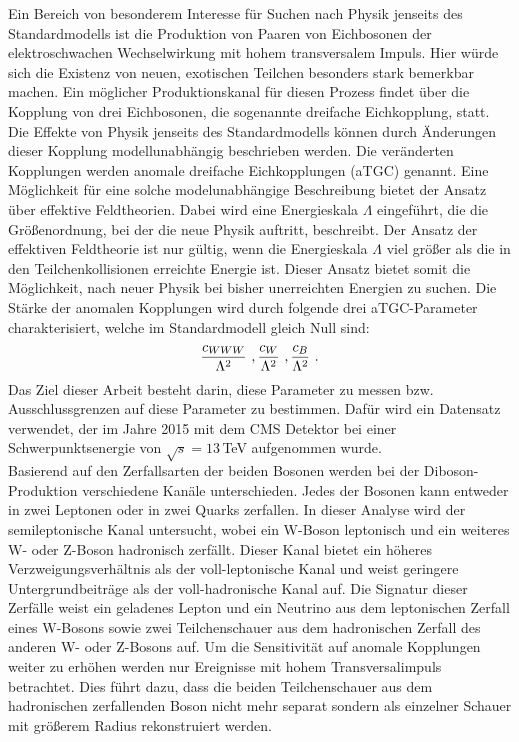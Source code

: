 Ein Bereich von besonderem Interesse für Suchen nach Physik jenseits des Standardmodells ist die Produktion von Paaren von Eichbosonen der elektroschwachen Wechselwirkung mit hohem transversalem Impuls. Hier würde sich die Existenz von neuen, exotischen Teilchen besonders stark bemerkbar machen. Ein möglicher Produktionskanal für diesen Prozess findet über die Kopplung von drei Eichbosonen, die sogenannte dreifache Eichkopplung, statt. Die Effekte von Physik jenseits des Standardmodells können durch Änderungen dieser Kopplung modellunabhängig beschrieben werden. Die veränderten Kopplungen werden anomale dreifache Eichkopplungen (aTGC) genannt. Eine Möglichkeit für eine solche modelunabhängige Beschreibung bietet der Ansatz über effektive Feldtheorien. Dabei wird eine Energieskala $\Lambda$ eingeführt, die die Größenordnung, bei der die neue Physik auftritt, beschreibt. Der Ansatz der effektiven Feldtheorie ist nur gültig, wenn die Energieskala $\Lambda$ viel größer als die in den Teilchenkollisionen erreichte Energie ist. Dieser Ansatz bietet somit die Möglichkeit, nach neuer Physik bei bisher unerreichten Energien zu suchen. Die Stärke der anomalen Kopplungen wird durch folgende drei aTGC-Parameter charakterisiert, welche im Standardmodell gleich Null sind:
\begin{equation*}
\frac{c_{WWW}}{\Lambda^2} \ , \frac{c_{W}}{\Lambda^2} \ , \frac{c_{B}}{\Lambda^2} \ .
\end{equation*}
Das Ziel dieser Arbeit besteht darin, diese Parameter zu messen bzw. Ausschlussgrenzen auf diese Parameter zu bestimmen. Dafür wird ein Datensatz verwendet, der im Jahre 2015 mit dem CMS Detektor bei einer Schwerpunktsenergie von $\sqrt{s}=13$\,TeV aufgenommen wurde.\\

Basierend auf den Zerfallsarten der beiden Bosonen werden bei der Diboson-Produktion verschiedene Kanäle unterschieden. Jedes der Bosonen kann entweder in zwei Leptonen oder in zwei Quarks zerfallen. In dieser Analyse wird der semileptonische Kanal untersucht, wobei ein W-Boson leptonisch und ein weiteres W- oder Z-Boson hadronisch zerfällt. Dieser Kanal bietet ein höheres Verzweigungsverhältnis als der voll-leptonische Kanal und weist geringere Untergrundbeiträge als der voll-hadronische Kanal auf. Die Signatur dieser Zerfälle weist ein geladenes Lepton und ein Neutrino aus dem leptonischen Zerfall eines W-Bosons sowie zwei Teilchenschauer aus dem hadronischen Zerfall des anderen W- oder Z-Bosons auf. Um die Sensitivität auf anomale Kopplungen weiter zu erhöhen werden nur Ereignisse mit hohem Transversalimpuls betrachtet. Dies führt dazu, dass die beiden Teilchenschauer aus dem hadronischen zerfallenden Boson nicht mehr separat sondern als einzelner Schauer mit größerem Radius rekonstruiert werden.\\

